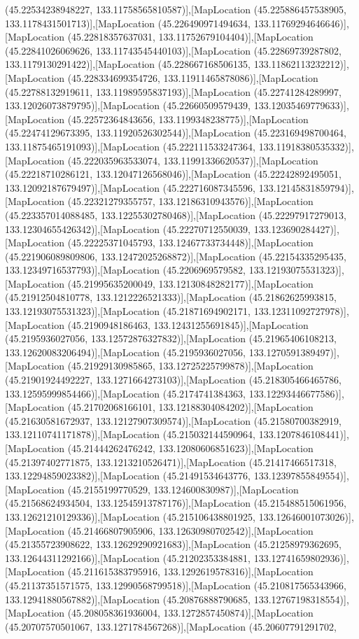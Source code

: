 (45.22534238948227, 133.11758565810587)],[MapLocation (45.225886457538905, 133.1178431501713)],[MapLocation (45.226490971494634, 133.11769294646646)],[MapLocation (45.22818357637031, 133.11752679104404)],[MapLocation (45.22841026069626, 133.11743545440103)],[MapLocation (45.22869739287802, 133.1179130291422)],[MapLocation (45.228667168506135, 133.11862113232212)],[MapLocation (45.228334699354726, 133.11911465878086)],[MapLocation (45.22788132919611, 133.11989595837193)],[MapLocation (45.22741284289997, 133.12026073879795)],[MapLocation (45.22660509579439, 133.12035469779633)],[MapLocation (45.22572364843656, 133.1199348238775)],[MapLocation (45.22474129673395, 133.11920526302544)],[MapLocation (45.223169498700464, 133.11875465191093)],[MapLocation (45.222111533247364, 133.11918380535332)],[MapLocation (45.222035963533074, 133.11991336620537)],[MapLocation (45.22218710286121, 133.12047126568046)],[MapLocation (45.22242892495051, 133.12092187679497)],[MapLocation (45.222716087345596, 133.12145831859794)],[MapLocation (45.22321279355757, 133.12186310943576)],[MapLocation (45.223357014088485, 133.12255302780468)],[MapLocation (45.22297917279013, 133.12304655426342)],[MapLocation (45.22270712550039, 133.123690284427)],[MapLocation (45.22225371045793, 133.12467733734448)],[MapLocation (45.221906089809806, 133.12472025268872)],[MapLocation (45.22154335295435, 133.12349716537793)],[MapLocation (45.2206969579582, 133.12193075531323)],[MapLocation (45.21995635200049, 133.12130848282177)],[MapLocation (45.21912504810778, 133.1212226521333)],[MapLocation (45.21862625993815, 133.12193075531323)],[MapLocation (45.21871694902171, 133.12311092727978)],[MapLocation (45.2190948186463, 133.12431255691845)],[MapLocation (45.2195936027056, 133.12572876327832)],[MapLocation (45.21965406108213, 133.12620083206494)],[MapLocation (45.2195936027056, 133.1270591389497)],[MapLocation (45.21929130985865, 133.12725225799878)],[MapLocation (45.21901924492227, 133.1271664273103)],[MapLocation (45.218305466465786, 133.12595999854466)],[MapLocation (45.2174741384363, 133.12293446677586)],[MapLocation (45.21702068166101, 133.12188304084202)],[MapLocation (45.21630581672937, 133.12127907309574)],[MapLocation (45.21580700382919, 133.12110741171878)],[MapLocation (45.215032144590964, 133.1207846108441)],[MapLocation (45.21444262476242, 133.12080606851623)],[MapLocation (45.21397402771875, 133.1213210526471)],[MapLocation (45.21417466517318, 133.12294859023382)],[MapLocation (45.21491534643776, 133.12397855849554)],[MapLocation (45.2155199770529, 133.124600830987)],[MapLocation (45.21568624934504, 133.12545913787176)],[MapLocation (45.215488515061956, 133.12621210129336)],[MapLocation (45.215106438801925, 133.12646001073026)],[MapLocation (45.21466807905906, 133.12630980702542)],[MapLocation (45.21355723908622, 133.12629290921683)],[MapLocation (45.21258979362695, 133.12644311292166)],[MapLocation (45.21202353384881, 133.12741659802936)],[MapLocation (45.211615383795916, 133.1292619578316)],[MapLocation (45.21137351571575, 133.12990568799518)],[MapLocation (45.210817565343966, 133.12941880567882)],[MapLocation (45.20876888790685, 133.12767198318554)],[MapLocation (45.208058361936004, 133.1272857450874)],[MapLocation (45.20707570501067, 133.1271784567268)],[MapLocation (45.20607791291702, 